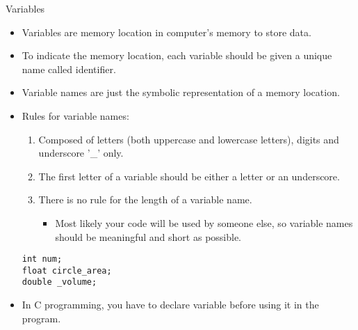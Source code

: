 \documentclass[10pt,t]{beamer}
\begin{document}
\begin{frame}[fragile]{Variables}
  \begin{itemize}
    \item Variables are memory location in computer's memory to store data.
    \item To indicate the memory location, each variable should be given a unique name called identifier. 
    \item Variable names are just the symbolic representation of a memory location.
    \item Rules for variable names:
    \begin{enumerate}
      \item Composed of letters (both uppercase and lowercase letters), digits and underscore '\_' only.
      \item The first letter of a variable should be either a letter or an underscore.
      \item There is no rule for the length of a variable name.
      \begin{itemize}
        \item Most likely your code will be used by someone else, so variable names should be meaningful and short as possible.
      \end{itemize}
    \end{enumerate}
    \begin{lstlisting}
int num;
float circle_area;
double _volume;
    \end{lstlisting}
    \item In C programming, you have to declare variable before using it in the program.
  \end{itemize}
\end{frame}
\end{document}
